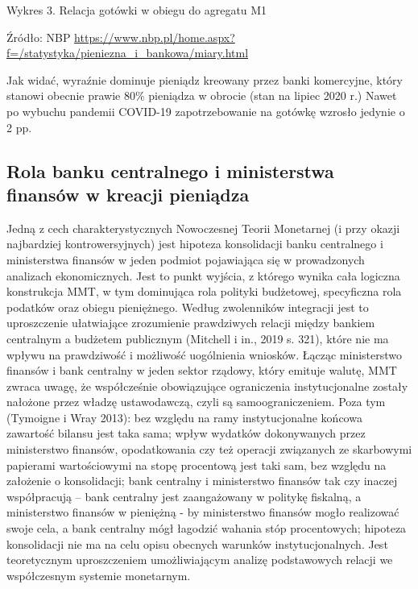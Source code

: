 \documentclass[
]{book}
\begin{document}
Wykres 3. Relacja gotówki w obiegu do agregatu M1

Źródło: NBP \url{https://www.nbp.pl/home.aspx?f=/statystyka/pieniezna_i_bankowa/miary.html}

Jak widać, wyraźnie dominuje pieniądz kreowany przez banki komercyjne, który stanowi obecnie prawie 80\% pieniądza w obrocie (stan na lipiec 2020 r.) Nawet po wybuchu pandemii COVID-19 zapotrzebowanie na gotówkę wzrosło jedynie o 2 pp.

\hypertarget{rola-banku-centralnego-i-ministerstwa-finansuxf3w-w-kreacji-pieniux105dza}{%
\subsection{Rola banku centralnego i ministerstwa finansów w kreacji pieniądza}\label{rola-banku-centralnego-i-ministerstwa-finansuxf3w-w-kreacji-pieniux105dza}}

Jedną z cech charakterystycznych Nowoczesnej Teorii Monetarnej (i przy okazji najbardziej kontrowersyjnych) jest hipoteza konsolidacji banku centralnego i ministerstwa finansów w jeden podmiot pojawiająca się w prowadzonych analizach ekonomicznych. Jest to punkt wyjścia, z którego wynika cała logiczna konstrukcja MMT, w tym dominująca rola polityki budżetowej, specyficzna rola podatków oraz obiegu pieniężnego. Według zwolenników integracji jest to uproszczenie ułatwiające zrozumienie prawdziwych relacji między bankiem centralnym a budżetem publicznym (Mitchell i in., 2019 s. 321), które nie ma wpływu na prawdziwość i możliwość uogólnienia wniosków. Łącząc ministerstwo finansów i bank centralny w jeden sektor rządowy, który emituje walutę, MMT zwraca uwagę, że współcześnie obowiązujące ograniczenia instytucjonalne zostały nałożone przez władzę ustawodawczą, czyli są samoograniczeniem. Poza tym (Tymoigne i Wray 2013): bez względu na ramy instytucjonalne końcowa zawartość bilansu jest taka sama; wpływ wydatków dokonywanych przez ministerstwo finansów, opodatkowania czy też operacji związanych ze skarbowymi papierami wartościowymi na stopę procentową jest taki sam, bez względu na założenie o konsolidacji; bank centralny i ministerstwo finansów tak czy inaczej współpracują -- bank centralny jest zaangażowany w politykę fiskalną, a ministerstwo finansów w pieniężną - by ministerstwo finansów mogło realizować swoje cela, a bank centralny mógł łagodzić wahania stóp procentowych; hipoteza konsolidacji nie ma na celu opisu obecnych warunków instytucjonalnych. Jest teoretycznym uproszczeniem umożliwiającym analizę podstawowych relacji we współczesnym systemie monetarnym.
\end{document}
